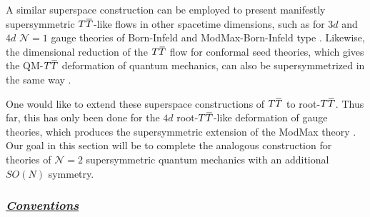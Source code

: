 \documentclass[12pt]{article}
\numberwithin{equation}{section}
\newcommand{\ul}{\underline}
\newcommand{\overbar}[1]{\mkern 1.5mu\overline{\mkern-1.5mu#1\mkern-1.5mu}\mkern 1.5mu}
\def\TT{{T\overbar{T}}}
\begin{document}
A similar superspace construction can be employed to present manifestly supersymmetric $\TT$-like flows in other spacetime dimensions, such as for $3d$ and $4d$ $\mathcal{N} = 1$ gauge theories of Born-Infeld and ModMax-Born-Infeld type \cite{Ferko:2019oyv,Ferko:2022iru,Ferko:2023sps}. Likewise, the dimensional reduction of the $\TT$ flow for conformal seed theories, which gives the QM-$\TT$ deformation of quantum mechanics, can also be supersymmetrized in the same way \cite{Ebert:2022xfh}.

One would like to extend these superspace constructions of $\TT$ to root-$\TT$. Thus far, this has only been done for the $4d$ root-$\TT$-like deformation of gauge theories, which produces the supersymmetric extension of the ModMax theory \cite{Ferko:2023ruw}. Our goal in this section will be to complete the analogous construction for theories of $\mathcal{N} = 2$ supersymmetric quantum mechanics with an additional $SO(N)$ symmetry.

\subsubsection*{\ul{\it Conventions}}
\end{document}
